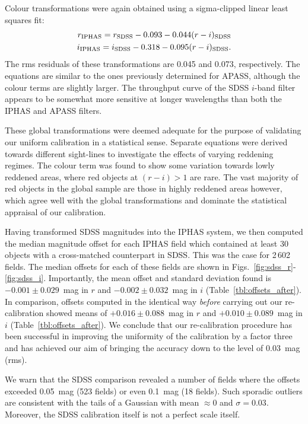 \documentclass[useAMS,usenatbib]{mn2e}
\begin{document}
Colour transformations were again obtained using a sigma-clipped linear least squares fit:
\begin{eqnarray}
r_{\rm IPHAS} = r_{\rm SDSS} - 0.093 - 0.044(r-i)_{\rm SDSS} \label{eqn:sdss_r} \\
i_{\rm IPHAS} = i_{\rm SDSS} - 0.318 - 0.095(r-i)_{\rm SDSS}. \label{eqn:sdss_i}
\end{eqnarray}
The rms residuals of these transformations are 0.045 and 0.073, respectively.
The equations are similar to the ones
previously determined for APASS,
although the colour terms are slightly larger.
The throughput curve of the SDSS $i$-band filter 
appears to be somewhat more sensitive at longer wavelengths
than both the IPHAS and APASS filters.

These global transformations were deemed adequate
for the purpose of validating our uniform calibration in a statistical sense.
Separate equations were derived towards different sight-lines
to investigate the effects of varying reddening regimes.
The colour term was found 
to show some variation towards lowly reddened areas,
where red objects at $(r-i) > 1$ are rare.
The vast majority of red objects in the global sample
are those in highly reddened areas however,
which agree well with the global transformations
and dominate the statistical appraisal of our calibration.

Having transformed SDSS magnitudes into the IPHAS system,
we then computed the median magnitude offset for each IPHAS field
which contained at least 30 objects with a cross-matched counterpart
in SDSS.
This was the case for 2\,602 fields.
The median offsets for each of these fields
are shown in Figs.~\ref{fig:sdss_r}-\ref{fig:sdss_i}.
Importantly, the mean offset and standard deviation found 
is $-0.001\pm0.029$~mag in $r$
and $-0.002\pm0.032$~mag in $i$ (Table~\ref{tbl:offsets_after}).
In comparison, offsets computed in the identical way
\emph{before} carrying out our re-calibration showed means
of $+0.016\pm0.088$~mag in $r$ and $+0.010\pm0.089$~mag in $i$ (Table~\ref{tbl:offsets_after}).
We conclude that our re-calibration procedure has
been successful in improving the
uniformity of the calibration by a factor three
and has achieved our aim of bringing the
accuracy down to the level of 0.03~mag (rms).

We warn that the SDSS comparison revealed a number of fields where the offsets
exceeded 0.05~mag (523 fields) or even 0.1~mag (18 fields).
Such sporadic outliers are consistent with the tails of a Gaussian
with mean $\approx0$ and $\sigma=0.03$.
Moreover, the SDSS calibration itself is not a perfect scale itself.
\end{document}
